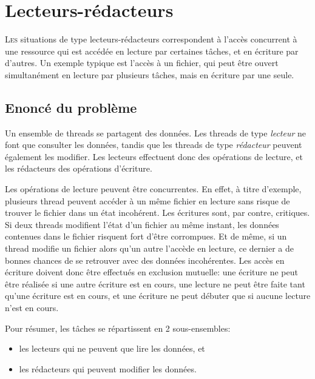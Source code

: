 \chapter{Lecteurs-rédacteurs}

\startchapter







\lettrine[lines=4]{L}{es} situations de type lecteurs-rédacteurs correspondent à l'accès concurrent à une ressource qui est accédée en lecture par certaines tâches, et en écriture par d'autres. Un exemple typique est l'accès à un fichier, qui peut être ouvert simultanément en lecture par plusieurs tâches, mais en écriture par une seule.

\section{Enoncé du problème}
Un ensemble de threads se partagent des données. Les threads de type \emph{lecteur} ne font que consulter les données, tandis que les threads de type \emph{rédacteur} peuvent également les modifier. Les lecteurs effectuent donc des opérations de lecture, et les rédacteurs des opérations d'écriture.

Les opérations de lecture peuvent être concurrentes. En effet, à titre d'exemple, plusieurs thread peuvent accéder à un même fichier en lecture sans risque de trouver le fichier dans un état incohérent. Les écritures sont, par contre, critiques. Si deux threads modifient l'état d'un fichier au même instant, les données contenues dans le fichier risquent fort d'être corrompues. Et de même, si un thread modifie un fichier alors qu'un autre l'accède en lecture, ce dernier a de bonnes chances de se retrouver avec des données incohérentes. Les accès en écriture doivent donc être effectués en exclusion mutuelle: une écriture ne peut être réalisée si une autre écriture est en cours, une lecture ne peut être faite tant qu'une écriture est en cours, et une écriture ne peut débuter que si aucune lecture n'est en cours.

Pour résumer, les tâches se répartissent en 2 sous-ensembles:

\begin{itemize}
\item les lecteurs qui ne peuvent que lire les données, et
\item les rédacteurs qui peuvent modifier les données.
\end{itemize}

